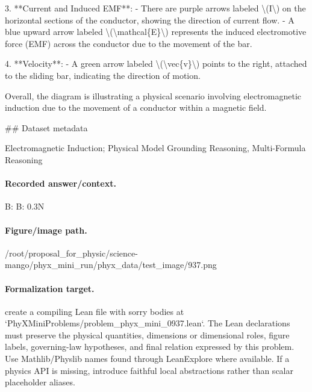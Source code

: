 3. **Current and Induced EMF**:
   - There are purple arrows labeled \textbackslash{}(I\textbackslash{}) on the horizontal sections of the conductor, showing the direction of current flow.
   - A blue upward arrow labeled \textbackslash{}(\textbackslash{}mathcal\{E\}\textbackslash{}) represents the induced electromotive force (EMF) across the conductor due to the movement of the bar.

4. **Velocity**:
   - A green arrow labeled \textbackslash{}(\textbackslash{}vec\{v\}\textbackslash{}) points to the right, attached to the sliding bar, indicating the direction of motion.

Overall, the diagram is illustrating a physical scenario involving electromagnetic induction due to the movement of a conductor within a magnetic field.

\#\# Dataset metadata

Electromagnetic Induction; Physical Model Grounding Reasoning, Multi-Formula Reasoning

\paragraph{Recorded answer/context.}
B: B: 0.3N

\paragraph{Figure/image path.}
/root/proposal\_for\_physic/science-mango/phyx\_mini\_run/phyx\_data/test\_image/937.png

\paragraph{Formalization target.}
create a compiling Lean file with sorry bodies at `PhyXMiniProblems/problem\_phyx\_mini\_0937.lean`. The Lean declarations must preserve the physical quantities, dimensions or dimensional roles, figure labels, governing-law hypotheses, and final relation expressed by this problem.
Use Mathlib/Physlib names found through LeanExplore where available. If a physics API is missing, introduce faithful local abstractions rather than scalar placeholder aliases.

